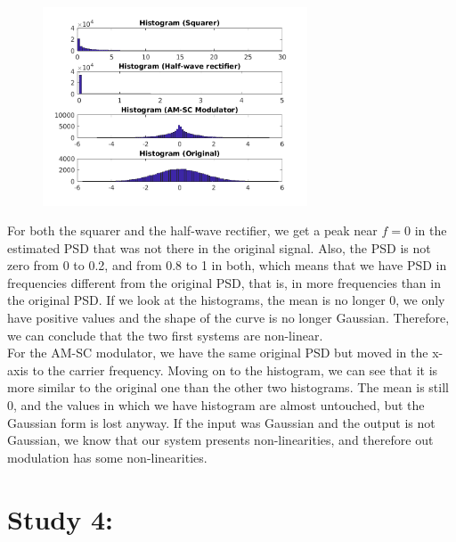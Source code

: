 \documentclass[a4paper,11pt]{article}
\begin{document}
\begin{figure}[!hp]
    \begin{center}
      \includegraphics[width=0.7\textwidth]{images/study3/comp_hist.png}
    \end{center}
\end{figure}

\newpage

For both the squarer and the half-wave rectifier, we get a peak near $f = 0$
in the estimated PSD that was not there in the original signal. Also, the PSD
is not zero from 0 to 0.2, and from 0.8 to 1 in both, which means that we have
PSD in frequencies different from the original PSD, that is, in more
frequencies than in the original PSD.
If we look at the histograms, the mean is no longer $0$, we only have positive
values and the shape of the curve is no longer Gaussian. Therefore, we can
conclude that the two first systems are non-linear.\\

For the AM-SC modulator, we have the same original PSD but moved in the x-axis
to the carrier frequency. Moving on to the histogram, we can see that it is
more similar to the original one than the other two histograms. The mean is
still $0$, and the values in which we have histogram are almost untouched, but
the Gaussian form is lost anyway. If the input was Gaussian and the output is
not Gaussian, we know that our system presents non-linearities, and therefore
out modulation has some non-linearities.\\

\newpage

\section{Study 4:}
\end{document}
